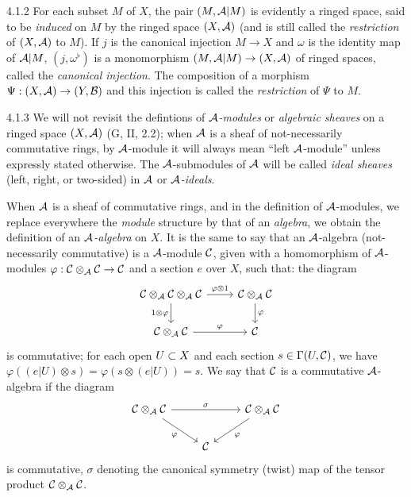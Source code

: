 \documentclass[../main.tex]{subfiles}
\begin{document}
\begin{env}{4.1.2}
For each subset $M$ of $X$, the pair $(M,\mathcal{A}|M)$ is evidently a ringed space, said
to be \emph{induced} on $M$ by the ringed space $(X,\mathcal{A})$ (and is still called
the \emph{restriction} of $(X,\mathcal{A})$ to $M$). If $j$ is the canonical injection
$M\to X$ and $\omega$ is the identity map of $\mathcal{A}|M$, $(j,\omega^\flat)$ is a
monomorphism $(M,\mathcal{A}|M)\to(X,\mathcal{A})$ of ringed spaces, called the
\emph{canonical injection}. The composition of a morphism
$\Psi:(X,\mathcal{A})\to(Y,\mathcal{B})$ and this injection is called the \emph{restriction}
of $\Psi$ to $M$.
\end{env}

\begin{env}{4.1.3}
We will not revisit the defintions of \emph{$\mathcal{A}$-modules} or
\emph{algebraic sheaves} on a ringed space $(X,\mathcal{A})$ (G, II, 2.2);
when $\mathcal{A}$ is a sheaf of not-necessarily commutative rings, by $\mathcal{A}$-module
it will always mean ``left $\mathcal{A}$-module'' unless expressly stated otherwise. The
$\mathcal{A}$-submodules of $\mathcal{A}$ will be called \emph{ideal sheaves} (left,
right, or two-sided) in $\mathcal{A}$ or \emph{$\mathcal{A}$-ideals}.

When $\mathcal{A}$ is a sheaf of commutative rings, and in the definition of
$\mathcal{A}$-modules, we replace everywhere the \emph{module} structure by that of
an \emph{algebra}, we obtain the definition of an \emph{$\mathcal{A}$-algebra} on $X$.
It is the same to say that an $\mathcal{A}$-algebra (not-necessarily commutative) is
a $\mathcal{A}$-module $\mathcal{C}$, given with a homomorphism of $\mathcal{A}$-modules
$\varphi:\mathcal{C}\otimes_{\mathcal{A}}\mathcal{C}\to\mathcal{C}$ and a section $e$ over $X$,
such that:  the diagram
\[
  \begin{tikzcd}
    \sheaf{C}\otimes_{\sheaf{A}}\sheaf{C}\otimes_{\sheaf{A}}\sheaf{C}
    \ar[r,"\varphi\otimes 1"]\ar[d,"1\otimes\varphi"'] &
    \sheaf{C}\otimes_{\sheaf{A}}\sheaf{C}\ar[d,"\varphi"]\\
    \sheaf{C}\otimes_{\sheaf{A}}\sheaf{C}\ar[r,"\varphi"] & \sheaf{C}
  \end{tikzcd}
\]
is commutative;  for each open $U\subset X$ and each section $s\in\Gamma(U,\mathcal{C})$,
we have $\varphi((e|U)\otimes s)=\varphi(s\otimes(e|U))=s$. We say that $\mathcal{C}$ is a
commutative $\mathcal{A}$-algebra if the diagram
\[
  \begin{tikzcd}
    \sheaf{C}\otimes_{\sheaf{A}}\sheaf{C}\ar[rr,"\sigma"]\ar[rd,"\varphi"']
    & & \sheaf{C}\otimes_{\sheaf{A}}\sheaf{C}\ar[ld,"\varphi"]\\
   & \sheaf{C}
  \end{tikzcd}
\]
is commutative, $\sigma$ denoting the canonical symmetry (twist) map of the tensor product
$\mathcal{C}\otimes_{\mathcal{A}}\mathcal{C}$.


\end{env}
\end{document}
